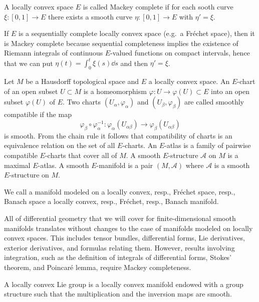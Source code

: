 \begin{defn}
    A locally convex space $E$ is called Mackey complete if for each sooth curve $\xi:[0,1]\to E$ there exists a smooth curve $\eta:[0,1]\to E$ with $\eta'=\xi$.
\end{defn}

\begin{rem}
    If $E$ is a sequentially complete locally convex space (e.g.~a Fr\'echet space), then it is Mackey complete because sequential completeness implies the existence of Riemann integrals of continuous $E$-valued functions on compact intervals, hence that we can put $\eta(t)=\int_0^t \xi(s)\dd s$ and then $\eta'=\xi$.
\end{rem}

\begin{defn}
    Let $M$ be a Hausdorff topological space and $E$ a locally convex space. An $E$-chart of an open subset $U\subset M$ is a homeomorphism $\varphi:U\to \varphi(U)\subset E$ into an open subset $\varphi(U)$ of $E$. Two charts $(U_\alpha,\varphi_\alpha)$ and $(U_\beta,\varphi_\beta)$ are called smoothly compatible  if the map
    \[\varphi_\beta\circ\varphi_\alpha^{-1}:\varphi_\alpha(U_{\alpha\beta})\to \varphi_\beta(U_{\alpha\beta})\]
    is smooth. From the chain rule it follows that compatibility of charts is an equivalence relation on the set of all $E$-charts. An $E$-atlas is a family of pairwise compatible $E$-charts that cover all of $M$. A smooth $E$-structure $\mathcal{A}$ on $M$ is a maximal $E$-atlas. A smooth $E$-manifold is a pair $(M,\mathcal{A})$ where $\mathcal{A}$ is a smooth $E$-structure on $M$.

    We call a manifold modeled on a locally convex, resp., Fr\'echet space, resp., Banach space a locally convex, resp., Fr\'echet, resp., Banach manifold.
\end{defn}

All of differential geometry that we will cover for finite-dimensional smooth manifolds translates without changes to the case of manifolds modeled on locally convex spaces. This includes tensor bundles, differential forms, Lie derivatives, exterior derivatives, and formulas relating them. However, results involving integration, such as the definition of integrals of differential forms, Stokes' theorem, and Poincar\'e lemma, require Mackey completeness.


\begin{defn}
    A locally convex Lie group is a locally convex manifold endowed with a group structure such that the multiplication and the inversion maps are smooth.
\end{defn}

